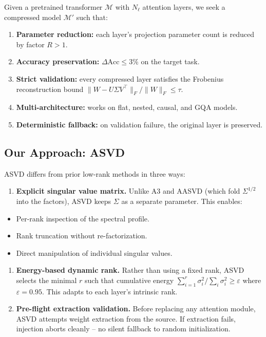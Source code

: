 Given a pretrained transformer $\mathcal{M}$ with $N_\ell$ attention layers, 
we seek a compressed model $\mathcal{M}'$ such that:

\begin{enumerate}
\item \textbf{Parameter reduction:} each layer's projection parameter count is
  reduced by factor $R > 1$.
\item \textbf{Accuracy preservation:} $\Delta\text{Acc} \leq 3\%$ on
  the target task.
\item \textbf{Strict validation:} every compressed layer satisfies the Frobenius
  reconstruction bound $\|W - U \Sigma V^\top\|_F / \|W\|_F \leq \tau$.
\item \textbf{Multi-architecture:} works on flat, nested, causal, and GQA models.
\item \textbf{Deterministic fallback:} on validation failure, the original layer is
  preserved.

\end{enumerate}
\subsection{Our Approach: ASVD}

ASVD differs from prior low-rank methods in three ways:

\begin{enumerate}
\item \textbf{Explicit singular value matrix.} Unlike A3 and AASVD (which fold
  $\Sigma^{1/2}$ into the factors), ASVD keeps $\Sigma$ as a separate
  parameter. This enables:
\end{enumerate}
\begin{itemize}
\item Per-rank inspection of the spectral profile.
\item Rank truncation without re-factorization.
\item Direct manipulation of individual singular values.

\end{itemize}
\begin{enumerate}
\item \textbf{Energy-based dynamic rank.} Rather than using a fixed rank, ASVD
  selects the minimal $r$ such that cumulative energy
  $\sum_{i=1}^r \sigma_i^2 / \sum_i \sigma_i^2 \geq \varepsilon$ where
  $\varepsilon = 0.95$. This adapts to each layer's
  intrinsic rank.

\item \textbf{Pre-flight extraction validation.} Before replacing any attention
  module, ASVD attempts weight extraction from the source. If extraction
  fails, injection aborts cleanly -- no silent fallback to random
  initialization.

\end{enumerate}
